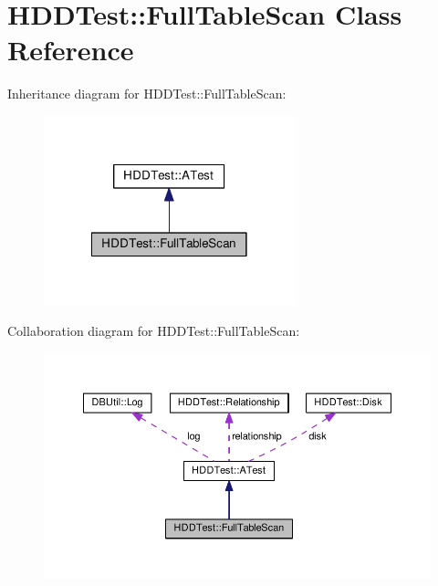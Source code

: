 \hypertarget{class_h_d_d_test_1_1_full_table_scan}{\section{H\-D\-D\-Test\-:\-:Full\-Table\-Scan Class Reference}
\label{class_h_d_d_test_1_1_full_table_scan}
}


Inheritance diagram for H\-D\-D\-Test\-:\-:Full\-Table\-Scan\-:\nopagebreak
\begin{figure}[H]
\begin{center}
\leavevmode
\includegraphics[width=206pt]{class_h_d_d_test_1_1_full_table_scan__inherit__graph}
\end{center}
\end{figure}


Collaboration diagram for H\-D\-D\-Test\-:\-:Full\-Table\-Scan\-:\nopagebreak
\begin{figure}[H]
\begin{center}
\leavevmode
\includegraphics[width=350pt]{class_h_d_d_test_1_1_full_table_scan__coll__graph}
\end{center}
\end{figure}
